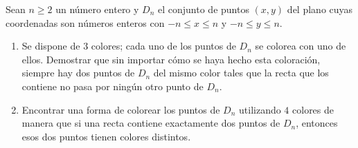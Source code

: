 Sean $n \geq 2$ un número entero y $D_n$ el conjunto de puntos $(x,y)$ del plano cuyas coordenadas son números enteros con $-n \leq x \leq n$ y $-n \leq y \leq n$.
 \begin{enumerate} 
   \item  Se dispone de $3$ colores; cada uno de los puntos de $D_n$ se colorea con uno de ellos. Demostrar que sin importar cómo se haya hecho esta coloración, siempre hay dos puntos de $D_n$ del mismo color tales que la recta que los contiene no pasa por ningún otro punto de $D_n$.
   \item  Encontrar una forma de colorear los puntos de $D_n$ utilizando $4$ colores de manera que si una recta contiene exactamente dos puntos de $D_n$, entonces esos dos puntos tienen colores distintos.
 \end{enumerate} 

